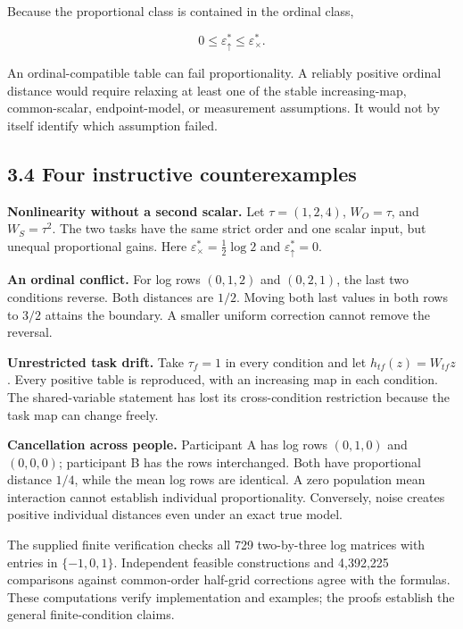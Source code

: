 \documentclass[
  11pt,
]{article}
\let\ctdoldsubsection\subsection
\renewcommand{\subsection}{\Needspace{6\baselineskip}\ctdoldsubsection}
\begin{document}
Because the proportional class is contained in the ordinal class,

\[
0\leq\varepsilon_\uparrow^*\leq\varepsilon_\times^*.
\]

An ordinal-compatible table can fail proportionality. A reliably
positive ordinal distance would require relaxing at least one of the
stable increasing-map, common-scalar, endpoint-model, or measurement
assumptions. It would not by itself identify which assumption failed.

\hypertarget{four-instructive-counterexamples}{%
\subsection{3.4 Four instructive
counterexamples}\label{four-instructive-counterexamples}}

\textbf{Nonlinearity without a second scalar.} Let \(\tau=(1,2,4)\),
\(W_O=\tau\), and \(W_S=\tau^2\). The two tasks have the same strict
order and one scalar input, but unequal proportional gains. Here
\(\varepsilon_\times^*=\frac12\log2\) and \(\varepsilon_\uparrow^*=0\).

\textbf{An ordinal conflict.} For log rows \((0,1,2)\) and \((0,2,1)\),
the last two conditions reverse. Both distances are \(1/2\). Moving both
last values in both rows to \(3/2\) attains the boundary. A smaller
uniform correction cannot remove the reversal.

\textbf{Unrestricted task drift.} Take \(\tau_f=1\) in every condition
and let \(h_{tf}(z)=W_{tf}z\). Every positive table is reproduced, with
an increasing map in each condition. The shared-variable statement has
lost its cross-condition restriction because the task map can change
freely.

\textbf{Cancellation across people.} Participant A has log rows
\((0,1,0)\) and \((0,0,0)\); participant B has the rows interchanged.
Both have proportional distance \(1/4\), while the mean log rows are
identical. A zero population mean interaction cannot establish
individual proportionality. Conversely, noise creates positive
individual distances even under an exact true model.

The supplied finite verification checks all 729 two-by-three log
matrices with entries in \(\{-1,0,1\}\). Independent feasible
constructions and 4,392,225 comparisons against common-order half-grid
corrections agree with the formulas. These computations verify
implementation and examples; the proofs establish the general
finite-condition claims.
\end{document}
